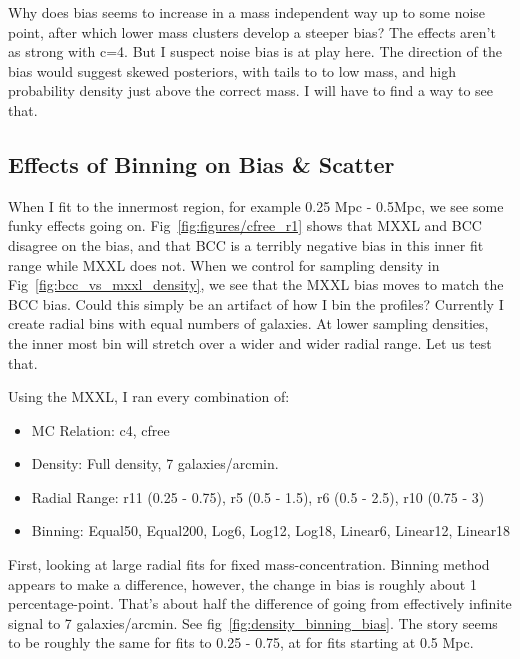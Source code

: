 \documentclass[11pt]{article}
\begin{document}
Why does bias seems to increase in a mass independent way up to some noise point, after which lower mass clusters develop a steeper bias? The effects aren't as strong with c=4. But I suspect noise bias is at play here. The direction of the bias would suggest skewed posteriors, with tails to to low mass, and high probability density just above the correct mass. I will have to find a way to see that.


\subsection{Effects of Binning on Bias \& Scatter}
\label{sec:binningmethod}

When I fit to the innermost region, for example 0.25 Mpc - 0.5Mpc, we see some funky effects going on. Fig~\ref{fig:figures/cfree_r1} shows that MXXL and BCC disagree on the bias, and that BCC is a terribly negative bias in this inner fit range while MXXL does not. When we control for sampling density in Fig~\ref{fig:bcc_vs_mxxl_density}, we see that the MXXL bias moves to match the BCC bias. Could this simply be an artifact of how I bin the profiles? Currently I create radial bins with equal numbers of galaxies. At lower sampling densities, the inner most bin will stretch over a wider and wider radial range. Let us test that.

Using the MXXL, I ran every combination of:

\begin{itemize}
\item MC Relation: c4, cfree
\item Density: Full density, 7 galaxies/arcmin.
\item Radial Range: r11 (0.25 - 0.75), r5 (0.5 - 1.5), r6 (0.5 - 2.5), r10 (0.75 - 3)
\item Binning: Equal50, Equal200, Log6, Log12, Log18, Linear6, Linear12, Linear18
\end{itemize}


First, looking at large radial fits for fixed mass-concentration. Binning method appears to make a difference, however, the change in bias is roughly about 1 percentage-point. That's about half the difference of going from effectively infinite signal to 7 galaxies/arcmin. See fig~\ref{fig:density_binning_bias}. The story seems to be roughly the same for fits to 0.25 - 0.75, at for fits starting at 0.5 Mpc.
\end{document}
